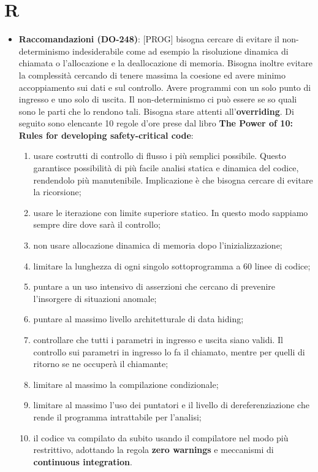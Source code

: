 %
%
%

\section{R}

\begin{itemize}

	\item \textbf{Raccomandazioni (DO-248)}: [PROG] bisogna cercare di evitare il non-determinismo indesiderabile come ad esempio la risoluzione dinamica di chiamata o l'allocazione e la deallocazione di memoria. Bisogna inoltre evitare la complessità cercando di tenere massima la coesione ed avere minimo accoppiamento sui dati e sul controllo. Avere programmi con un solo punto di ingresso e uno solo di uscita. Il non-determinismo ci può essere se so quali sono le parti che lo rendono tali. Bisogna stare attenti all'\textbf{overriding}. Di seguito sono elencante 10 regole d'ore prese dal libro \textbf{The Power of 10: Rules for developing safety-critical code}:
		\begin{enumerate}
			\item usare costrutti di controllo di flusso i più semplici possibile. Questo garantisce possibilità di più facile analisi statica e dinamica del codice, rendendolo più manutenibile. Implicazione è che bisogna cercare di evitare la ricorsione;
			\item usare le iterazione con limite superiore statico. In questo modo sappiamo sempre dire dove sarà il controllo;
			\item non usare allocazione dinamica di memoria dopo l'inizializzazione;
			\item limitare la lunghezza di ogni singolo sottoprogramma a 60 linee di codice;
			\item puntare a un uso intensivo di asserzioni che cercano di prevenire l'insorgere di situazioni anomale;
			\item puntare al massimo livello architetturale di data hiding;
			\item controllare che tutti i parametri in ingresso e uscita siano validi. Il controllo sui parametri in ingresso lo fa il chiamato, mentre per quelli di ritorno se ne occuperà il chiamante;
			\item limitare al massimo la compilazione condizionale;
			\item limitare al massimo l'uso dei puntatori e il livello di dereferenziazione che rende il programma intrattabile per l'analisi;
			\item il codice va compilato da subito usando il compilatore nel modo più restrittivo, adottando la regola \textbf{zero warnings} e meccanismi di \textbf{continuous integration}.
		\end{enumerate}


\end{itemize}
